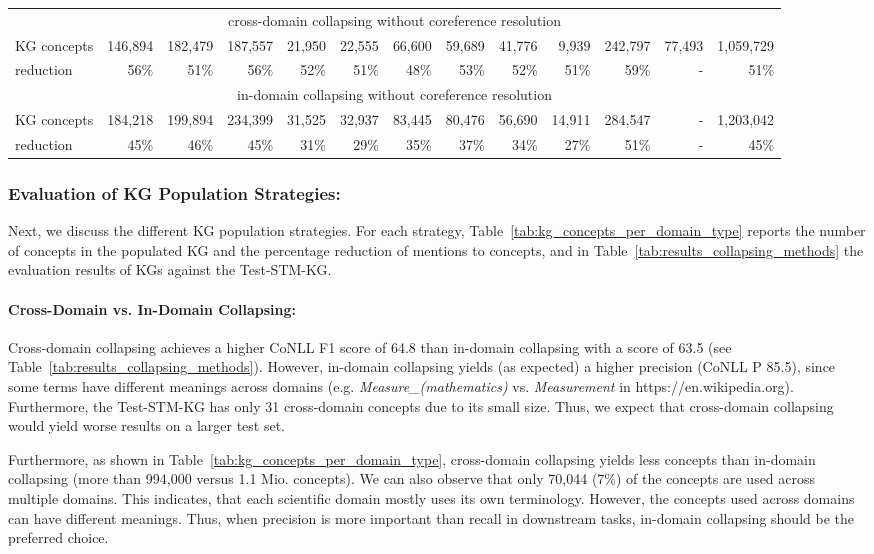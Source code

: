 \documentclass[runningheads]{llncs}
\begin{document}
\begin{table}[tb]
{\begin{tabular}{l|rrrrrrrrrrr|r}
\multicolumn{13}{c}{cross-domain collapsing without coreference resolution}\\
KG concepts	& 146,894 & 	182,479 & 	187,557 & 	21,950 & 	22,555 & 	66,600 & 	59,689 &  	41,776 & 	9,939 & 	242,797 & 77,493 &	1,059,729 \\
reduction	& 56\% &	51\% &	56\% &	52\% &	51\% &	48\% &	53\% &	52\% &	51\% &	59\% &	- & 51\%  \\
\hline

\multicolumn{13}{c}{in-domain collapsing without coreference resolution}\\
KG concepts &	184,218 &	199,894 &	234,399 &	31,525 &	32,937 &	83,445 &	80,476 &	56,690 &	14,911 &	284,547 & - &	1,203,042 \\
reduction &	45\% &	46\% &	45\% &	31\% &	29\% &	35\% &	37\% &	34\% &	27\% &	51\% &	-& 45\% 

\end{tabular}
}
\vspace{-1em}
\end{table}


\subsubsection{Evaluation of KG Population Strategies:}
Next, we discuss the different KG population strategies.
For each strategy, Table~\ref{tab:kg_concepts_per_domain_type} reports the number of concepts in the populated KG and the percentage reduction of mentions to concepts, and in Table~\ref{tab:results_collapsing_methods} the evaluation results of KGs against the Test-STM-KG.

\paragraph{Cross-Domain vs. In-Domain Collapsing:}
Cross-domain collapsing achieves a higher CoNLL F1 score of 64.8 than in-domain collapsing with a score of 63.5 (see Table~\ref{tab:results_collapsing_methods}).
However, in-domain collapsing yields (as expected) a higher precision (CoNLL P 85.5), since some terms have different meanings across domains (e.g. \textit{Measure\_(mathematics)} vs. \textit{Measurement} in https://en.wikipedia.org).
Furthermore, the Test-STM-KG has only 31 cross-domain concepts due to its small size. 
Thus, we expect that cross-domain collapsing would yield worse results on a larger test set. 

Furthermore, as shown in Table~\ref{tab:kg_concepts_per_domain_type}, cross-domain collapsing yields less concepts than in-domain collapsing (more than 994,000 versus 1.1 Mio. concepts).
We can also observe that only 70,044 (7\%) of the concepts are used across multiple domains.
This indicates, that each scientific domain mostly uses its own terminology.
However, the concepts used across domains can have different meanings. 
Thus, when precision is more important than recall in downstream tasks, in-domain collapsing should be the preferred choice.
\end{document}
